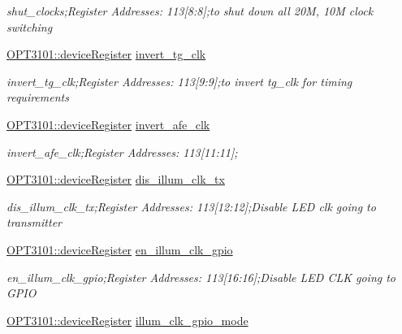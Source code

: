 \begin{DoxyCompactItemize}
\begin{DoxyCompactList}\small\item\em shut\+\_\+clocks;Register Addresses\+: 113\mbox{[}8\+:8\mbox{]};to shut down all 20M, 10M clock switching \end{DoxyCompactList}\item 
\mbox{\hyperlink{class_o_p_t3101_1_1device_register}{O\+P\+T3101\+::device\+Register}} \mbox{\hyperlink{class_o_p_t3101_1_1registers_a58c0441a1f64e43e1ca7225dbb6da367}{invert\+\_\+tg\+\_\+clk}}
\begin{DoxyCompactList}\small\item\em invert\+\_\+tg\+\_\+clk;Register Addresses\+: 113\mbox{[}9\+:9\mbox{]};to invert tg\+\_\+clk for timing requirements \end{DoxyCompactList}\item 
\mbox{\hyperlink{class_o_p_t3101_1_1device_register}{O\+P\+T3101\+::device\+Register}} \mbox{\hyperlink{class_o_p_t3101_1_1registers_a268d16eaac8153c1d761d26f704dadfa}{invert\+\_\+afe\+\_\+clk}}
\begin{DoxyCompactList}\small\item\em invert\+\_\+afe\+\_\+clk;Register Addresses\+: 113\mbox{[}11\+:11\mbox{]}; \end{DoxyCompactList}\item 
\mbox{\hyperlink{class_o_p_t3101_1_1device_register}{O\+P\+T3101\+::device\+Register}} \mbox{\hyperlink{class_o_p_t3101_1_1registers_ac9ceab4db2106751addab3a041dcb858}{dis\+\_\+illum\+\_\+clk\+\_\+tx}}
\begin{DoxyCompactList}\small\item\em dis\+\_\+illum\+\_\+clk\+\_\+tx;Register Addresses\+: 113\mbox{[}12\+:12\mbox{]};Disable L\+ED clk going to transmitter \end{DoxyCompactList}\item 
\mbox{\hyperlink{class_o_p_t3101_1_1device_register}{O\+P\+T3101\+::device\+Register}} \mbox{\hyperlink{class_o_p_t3101_1_1registers_a98029ccfd8f7c1c326f30f0d4e96eee2}{en\+\_\+illum\+\_\+clk\+\_\+gpio}}
\begin{DoxyCompactList}\small\item\em en\+\_\+illum\+\_\+clk\+\_\+gpio;Register Addresses\+: 113\mbox{[}16\+:16\mbox{]};Disable L\+ED C\+LK going to G\+P\+IO \end{DoxyCompactList}\item 
\mbox{\hyperlink{class_o_p_t3101_1_1device_register}{O\+P\+T3101\+::device\+Register}} \mbox{\hyperlink{class_o_p_t3101_1_1registers_a96d3a8085b94d0560f8e8c8f7611aaab}{illum\+\_\+clk\+\_\+gpio\+\_\+mode}}

\end{DoxyCompactItemize}
